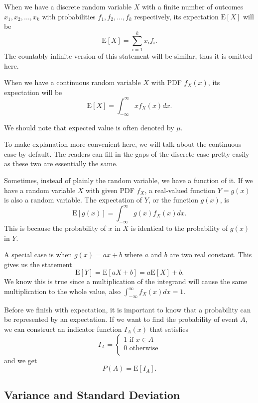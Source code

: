 \documentclass[11pt, a4paper, oneside]{book}
\theoremstyle{definition}
\newcommand{\E}[1]{\text{E}[#1]}
\begin{document}
\noindent When we have a discrete random variable $X$ with a finite number of outcomes $x_1, x_2, \dots, x_k$ with probabilities $f_1, f_2, \dots, f_k$ respectively, its expectation $\E{X}$ will be\[
\E{X} = \sum_{i=1}^{k}x_i f_i.
\]
The countably infinite version of this statement will be similar, thus it is omitted here. 

\noindent When we have a continuous random variable $X$ with PDF $f_X(x)$, its expectation will be\[
\E{X} = \int^{\infty}_{-\infty}xf_X(x)dx.
\]

\noindent We should note that expected value is often denoted by $\mu$.

\noindent To make explanation more convenient here, we will talk about the continuous case by default. The readers can fill in the gaps of the discrete case pretty easily as these two are essentially the same. 

\noindent Sometimes, instead of plainly the random variable, we have a function of it. If we have a random variable $X$ with given PDF $f_X$, a real-valued function $Y = g(x)$ is also a random variable. The expectation of $Y$, or the function $g(x)$, is\[
\E{g(x)} = \int^{\infty}_{-\infty}g(x)f_X(x)dx.
\]
This is because the probability of $x$ in $X$ is identical to the probability of $g(x)$ in $Y$.  

\noindent A special case is when $g(x) = ax+b$ where $a$ and $b$ are two real constant. This gives us the statement\[
\E{Y} = \E{aX+b} = a\E{X} + b. 
\]
We know this is true since a multiplication of the integrand will cause the same multiplication to the whole value, also $\int^{\infty}_{-\infty}f_X(x)dx = 1$. 

\noindent Before we finish with expectation, it is important to know that a probability can be represented by an expectation. If we want to find the probability of event $A$, we can construct an indicator function $I_A(x)$ that satisfies \begin{equation*}
I_A = 
\begin{cases} 
      1 \text{ if } x \in A\\
      0 \text{ otherwise}\\
\end{cases}
\end{equation*}
and we get\[
P(A) = \E{I_A}.
\]

\subsection{Variance and Standard Deviation}
\end{document}
